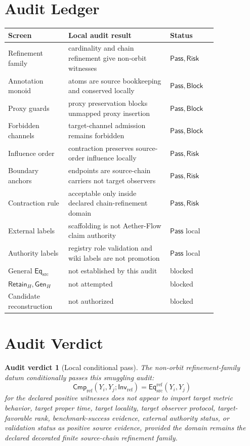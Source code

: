 \documentclass[11pt]{article}
\newcommand{\EqSrc}{\mathsf{Eq}_{\mathrm{src}}}
\newcommand{\EqRef}{\mathsf{Eq}_{\mathrm{src}}^{\mathrm{ref}}}
\newcommand{\InvRef}{\mathsf{Inv}_{\mathrm{ref}}}
\newcommand{\CmpRef}{\mathsf{Cmp}_{\mathrm{ref}}}
\newcommand{\RetainH}{\mathsf{Retain}_{H}}
\newcommand{\GenH}{\mathsf{Gen}_{H}}
\newcommand{\Pass}{\mathsf{Pass}}
\newcommand{\Block}{\mathsf{Block}}
\newcommand{\Risk}{\mathsf{Risk}}
\newtheorem{auditverdict}{Audit verdict}
\begin{document}
\section{Audit Ledger}

\begin{center}
\begin{tabular}{p{0.23\linewidth}p{0.41\linewidth}p{0.18\linewidth}}
\textbf{Screen} & \textbf{Local audit result} & \textbf{Status} \\
\hline
Refinement family & cardinality and chain refinement give non-orbit witnesses & \(\Pass,\Risk\) \\
Annotation monoid & atoms are source bookkeeping and conserved locally & \(\Pass,\Block\) \\
Proxy guards & proxy preservation blocks unmapped proxy insertion & \(\Pass,\Block\) \\
Forbidden channels & target-channel admission remains forbidden & \(\Pass,\Block\) \\
Influence order & contraction preserves source-order influence locally & \(\Pass,\Risk\) \\
Boundary anchors & endpoints are source-chain carriers not target observers & \(\Pass,\Risk\) \\
Contraction rule & acceptable only inside declared chain-refinement domain & \(\Pass,\Risk\) \\
External labels & scaffolding is not Aether-Flow claim authority & \(\Pass\) local \\
Authority labels & registry role validation and wiki labels are not promotion & \(\Pass\) local \\
General \(\EqSrc\) & not established by this audit & blocked \\
\(\RetainH,\GenH\) & not attempted & blocked \\
Candidate reconstruction & not authorized & blocked \\
\end{tabular}
\end{center}

\section{Audit Verdict}

\begin{auditverdict}[Local conditional pass]
The non-orbit refinement-family datum conditionally passes this
smuggling audit:
\[
    \CmpRef(Y_i,Y_j;\InvRef)=\EqRef(Y_i,Y_j)
\]
for the declared positive witnesses does not appear to import target
metric behavior, target proper time, target locality, target observer
protocol, target-favorable rank, benchmark-success evidence, external
authority status, or validation status as positive source evidence,
provided the domain remains the declared decorated finite source-chain
refinement family.
\end{auditverdict}
\end{document}
